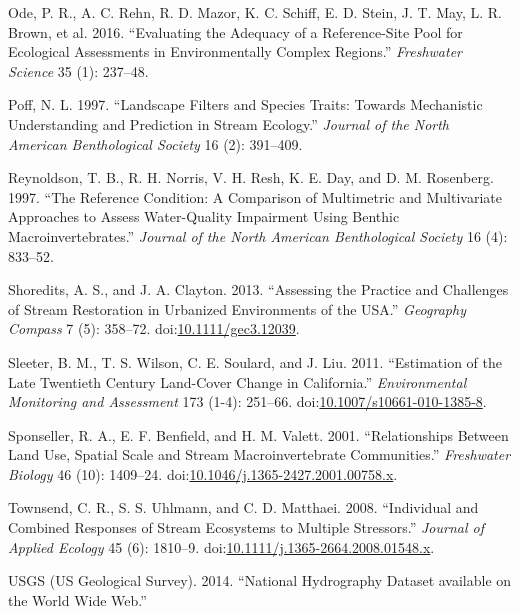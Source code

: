\documentclass[]{article}
\begin{document}
\hypertarget{ref-Ode16}{}
Ode, P. R., A. C. Rehn, R. D. Mazor, K. C. Schiff, E. D. Stein, J. T.
May, L. R. Brown, et al. 2016. ``Evaluating the Adequacy of a
Reference-Site Pool for Ecological Assessments in Environmentally
Complex Regions.'' \emph{Freshwater Science} 35 (1): 237--48.

\hypertarget{ref-Poff97}{}
Poff, N. L. 1997. ``Landscape Filters and Species Traits: Towards
Mechanistic Understanding and Prediction in Stream Ecology.''
\emph{Journal of the North American Benthological Society} 16 (2):
391--409.

\hypertarget{ref-Reynoldson97}{}
Reynoldson, T. B., R. H. Norris, V. H. Resh, K. E. Day, and D. M.
Rosenberg. 1997. ``The Reference Condition: A Comparison of Multimetric
and Multivariate Approaches to Assess Water-Quality Impairment Using
Benthic Macroinvertebrates.'' \emph{Journal of the North American
Benthological Society} 16 (4): 833--52.

\hypertarget{ref-Shoredits13}{}
Shoredits, A. S., and J. A. Clayton. 2013. ``Assessing the Practice and
Challenges of Stream Restoration in Urbanized Environments of the USA.''
\emph{Geography Compass} 7 (5): 358--72.
doi:\href{https://doi.org/10.1111/gec3.12039}{10.1111/gec3.12039}.

\hypertarget{ref-Sleeter11}{}
Sleeter, B. M., T. S. Wilson, C. E. Soulard, and J. Liu. 2011.
``Estimation of the Late Twentieth Century Land-Cover Change in
California.'' \emph{Environmental Monitoring and Assessment} 173 (1-4):
251--66.
doi:\href{https://doi.org/10.1007/s10661-010-1385-8}{10.1007/s10661-010-1385-8}.

\hypertarget{ref-Sponseller01}{}
Sponseller, R. A., E. F. Benfield, and H. M. Valett. 2001.
``Relationships Between Land Use, Spatial Scale and Stream
Macroinvertebrate Communities.'' \emph{Freshwater Biology} 46 (10):
1409--24.
doi:\href{https://doi.org/10.1046/j.1365-2427.2001.00758.x}{10.1046/j.1365-2427.2001.00758.x}.

\hypertarget{ref-Townsend08}{}
Townsend, C. R., S. S. Uhlmann, and C. D. Matthaei. 2008. ``Individual
and Combined Responses of Stream Ecosystems to Multiple Stressors.''
\emph{Journal of Applied Ecology} 45 (6): 1810--9.
doi:\href{https://doi.org/10.1111/j.1365-2664.2008.01548.x}{10.1111/j.1365-2664.2008.01548.x}.

\hypertarget{ref-USGS14}{}
USGS (US Geological Survey). 2014. ``National Hydrography Dataset
available on the World Wide Web.''
\end{document}
